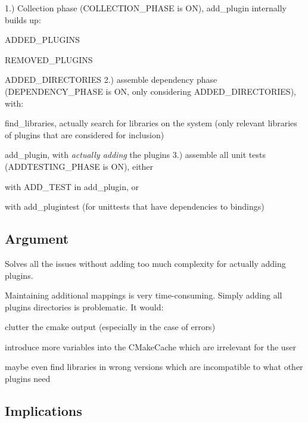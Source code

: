 1.) Collection phase ({\ttfamily C\+O\+L\+L\+E\+C\+T\+I\+O\+N\+\_\+\+P\+H\+A\+S\+E} is {\ttfamily O\+N}), add\+\_\+plugin internally builds up\+:
\begin{DoxyItemize}
\item {\ttfamily A\+D\+D\+E\+D\+\_\+\+P\+L\+U\+G\+I\+N\+S}
\item {\ttfamily R\+E\+M\+O\+V\+E\+D\+\_\+\+P\+L\+U\+G\+I\+N\+S}
\item {\ttfamily A\+D\+D\+E\+D\+\_\+\+D\+I\+R\+E\+C\+T\+O\+R\+I\+E\+S} 2.) assemble dependency phase ({\ttfamily D\+E\+P\+E\+N\+D\+E\+N\+C\+Y\+\_\+\+P\+H\+A\+S\+E} is {\ttfamily O\+N}, only considering {\ttfamily A\+D\+D\+E\+D\+\_\+\+D\+I\+R\+E\+C\+T\+O\+R\+I\+E\+S}), with\+:
\item find\+\_\+libraries, actually search for libraries on the system (only relevant libraries of plugins that are considered for inclusion)
\item add\+\_\+plugin, with {\itshape actually adding} the plugins 3.) assemble all unit tests ({\ttfamily A\+D\+D\+T\+E\+S\+T\+I\+N\+G\+\_\+\+P\+H\+A\+S\+E} is {\ttfamily O\+N}), either
\item with {\ttfamily A\+D\+D\+\_\+\+T\+E\+S\+T} in {\ttfamily add\+\_\+plugin}, or
\item with {\ttfamily add\+\_\+plugintest} (for unittests that have dependencies to bindings)
\end{DoxyItemize}

\subsection*{Argument}

Solves all the issues without adding too much complexity for actually adding plugins.

Maintaining additional mappings is very time-\/consuming. Simply adding all plugins directories is problematic. It would\+:


\begin{DoxyItemize}
\item clutter the cmake output (especially in the case of errors)
\item introduce more variables into the C\+Make\+Cache which are irrelevant for the user
\item maybe even find libraries in wrong versions which are incompatible to what other plugins need
\end{DoxyItemize}

\subsection*{Implications}


